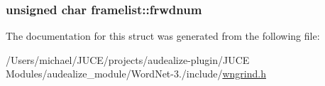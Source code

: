\subsubsection[{\texorpdfstring{frwdnum}{frwdnum}}]{\setlength{\rightskip}{0pt plus 5cm}unsigned char framelist\+::frwdnum}\hypertarget{structframelist_af71c96731b860d8287e90f11cae1787b}{}\label{structframelist_af71c96731b860d8287e90f11cae1787b}


The documentation for this struct was generated from the following file\+:\begin{DoxyCompactItemize}
\item 
/\+Users/michael/\+J\+U\+C\+E/projects/audealize-\/plugin/\+J\+U\+C\+E Modules/audealize\+\_\+module/\+Word\+Net-\/3./include/\hyperlink{wngrind_8h}{wngrind.\+h}\end{DoxyCompactItemize}

